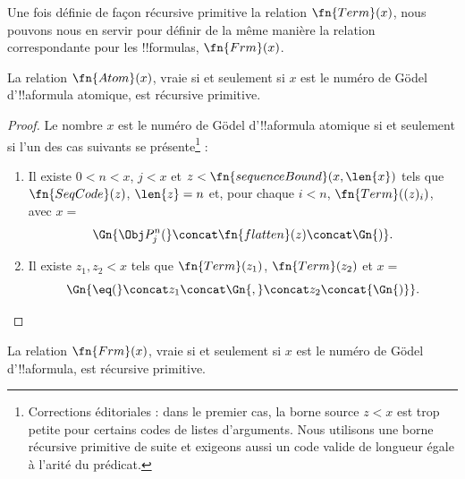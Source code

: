 \documentclass[../../../include/open-logic-section]{subfiles}
\begin{document}

Une fois définie de façon récursive primitive la relation
$\fn{Term}(x)$, nous pouvons nous en servir pour définir de la même
manière la relation correspondante pour les !!{formula}s,
$\fn{Frm}(x)$.

\begin{prop}
La relation $\fn{Atom}(x)$, vraie si et seulement si $x$ est le
numéro de G\"odel d'!!a{formula} atomique, est récursive primitive.
\end{prop}

\begin{proof}
Le nombre $x$ est le numéro de G\"odel d'!!a{formula} atomique si
et seulement si l'un des cas suivants se présente\footnote{Corrections éditoriales : dans le premier cas, la borne source $z<x$ est trop petite pour certains codes de listes d'arguments. Nous utilisons une borne récursive primitive de suite et exigeons aussi un code valide de longueur égale à l'arité du prédicat.} :
\begin{enumerate}
\item Il existe $0<n<x$, $j<x$ et $z<\fn{sequenceBound}(x,\len{x})$ tels que $\fn{SeqCode}(z)$, $\len{z}=n$ et, pour chaque $i<n$,
  $\fn{Term}((z)_i)$, avec $x = $
\[
\Gn{\Obj P^n_j(} \concat \fn{flatten}(z) \concat \Gn{)}.
\]
\item Il existe $z_1, z_2 < x$ tels que $\fn{Term}(z_1)$,
  $\fn{Term}(z_2)$ et $x = $
\[
\Gn{{\eq}(} \concat z_1 \concat \Gn{,} \concat z_2 \concat{\Gn{)}}.
\]
\end{enumerate}
\end{proof}

\begin{prop}
La relation $\fn{Frm}(x)$, vraie si et seulement si $x$ est le
numéro de G\"odel d'!!a{formula}, est récursive primitive.
\end{prop}
\end{document}
